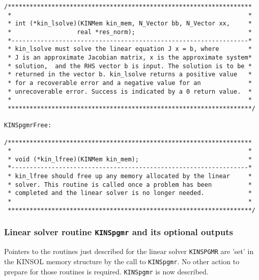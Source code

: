 \documentclass[11pt]{article}
\begin{document}
\begin{verbatim}
/*******************************************************************
 *                                                                 *
 * int (*kin_lsolve)(KINMem kin_mem, N_Vector bb, N_Vector xx,     *
 *                  real *res_norm);                               *
 *-----------------------------------------------------------------*
 * kin_lsolve must solve the linear equation J x = b, where        *
 * J is an approximate Jacobian matrix, x is the approximate system*
 * solution,  and the RHS vector b is input. The solution is to be *
 * returned in the vector b. kin_lsolve returns a positive value   *
 * for a recoverable error and a negative value for an             *
 * unrecoverable error. Success is indicated by a 0 return value.  *
 *                                                                 *
 *******************************************************************/

KINSpgmrFree:

/*******************************************************************
 *                                                                 *
 * void (*kin_lfree)(KINMem kin_mem);                              *
 *-----------------------------------------------------------------*
 * kin_lfree should free up any memory allocated by the linear     *
 * solver. This routine is called once a problem has been          *
 * completed and the linear solver is no longer needed.            *
 *                                                                 *
 *******************************************************************/

\end{verbatim}
\normalsize

\subsubsection{Linear solver routine {\tt KINSpgmr} and its optional outputs}

Pointers to the routines just described for the linear solver {\tt KINSPGMR} 
are 'set' in the KINSOL memory structure by the call to {\tt KINSpgmr}. No 
other action to prepare for those routines is required. {\tt KINSpgmr} is now 
described.
\end{document}
